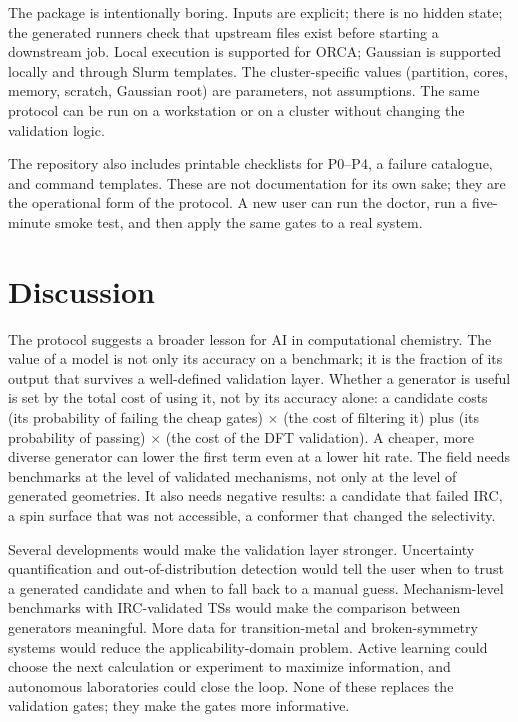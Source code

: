 \documentclass[11pt,a4paper]{article}
\begin{document}
The package is intentionally boring. Inputs are explicit; there is no hidden state; the generated runners check that upstream files exist before starting a downstream job. Local execution is supported for ORCA; Gaussian is supported locally and through Slurm templates. The cluster-specific values (partition, cores, memory, scratch, Gaussian root) are parameters, not assumptions. The same protocol can be run on a workstation or on a cluster without changing the validation logic.

The repository also includes printable checklists for P0--P4, a failure catalogue, and command templates. These are not documentation for its own sake; they are the operational form of the protocol. A new user can run the doctor, run a five-minute smoke test, and then apply the same gates to a real system.

\section{Discussion}

The protocol suggests a broader lesson for AI in computational chemistry. The value of a model is not only its accuracy on a benchmark; it is the fraction of its output that survives a well-defined validation layer. Whether a generator is useful is set by the total cost of using it, not by its accuracy alone: a candidate costs (its probability of failing the cheap gates) $\times$ (the cost of filtering it) plus (its probability of passing) $\times$ (the cost of the DFT validation). A cheaper, more diverse generator can lower the first term even at a lower hit rate. The field needs benchmarks at the level of validated mechanisms, not only at the level of generated geometries. It also needs negative results: a candidate that failed IRC, a spin surface that was not accessible, a conformer that changed the selectivity.

Several developments would make the validation layer stronger. Uncertainty quantification and out-of-distribution detection would tell the user when to trust a generated candidate and when to fall back to a manual guess. Mechanism-level benchmarks with IRC-validated TSs would make the comparison between generators meaningful. More data for transition-metal and broken-symmetry systems would reduce the applicability-domain problem. Active learning could choose the next calculation or experiment to maximize information, and autonomous laboratories could close the loop. None of these replaces the validation gates; they make the gates more informative.
\end{document}

